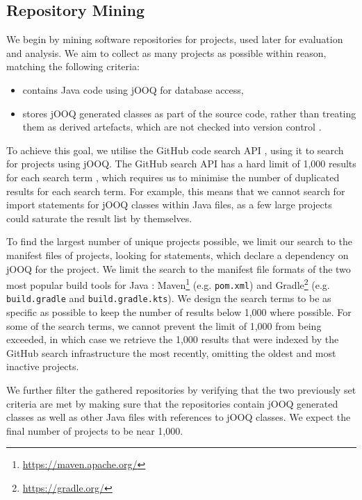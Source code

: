 \documentclass{article}
\begin{document}
\subsection{Repository Mining}\label{sec:mining}

We begin by mining software repositories for projects, used later for evaluation and analysis. We aim to collect as many projects as possible within reason, matching the following criteria:
\begin{itemize}
    \item contains Java code using jOOQ for database access,
    \item stores jOOQ generated classes as part of the source code, rather than treating them as derived artefacts, which are not checked into version control \cite{jooq2025code}.
\end{itemize}

To achieve this goal, we utilise the GitHub code search API \cite{githubSearchApi}, using it to search for projects using jOOQ. The GitHub search API has a hard limit of 1,000 results for each search term \cite{githubSearchApi}, which requires us to minimise the number of duplicated results for each search term. For example, this means that we cannot search for import statements for jOOQ classes within Java files, as a few large projects could saturate the result list by themselves.

To find the largest number of unique projects possible, we limit our search to the manifest files of projects, looking for statements, which declare a dependency on jOOQ for the project. We limit the search to the manifest file formats of the two most popular build tools for Java \cite{stackOverflowSurvey}: Maven\footnote{\hyperlink{https://maven.apache.org/}{https://maven.apache.org/}} (e.g. \lstinline{pom.xml}) and Gradle\footnote{\hyperlink{https://gradle.org/}{https://gradle.org/}} (e.g. \lstinline{build.gradle} and \lstinline{build.gradle.kts}). We design the search terms to be as specific as possible to keep the number of results below 1,000 where possible. For some of the search terms, we cannot prevent the limit of 1,000 from being exceeded, in which case we retrieve the 1,000 results that were indexed by the GitHub search infrastructure the most recently, omitting the oldest and most inactive projects.

We further filter the gathered repositories by verifying that the two previously set criteria are met by making sure that the repositories contain jOOQ generated classes as well as other Java files with references to jOOQ classes. We expect the final number of projects to be near 1,000.
\end{document}
